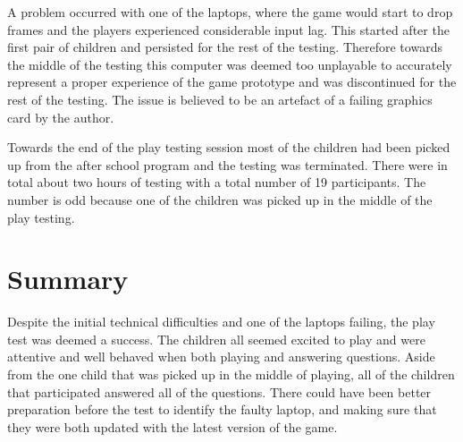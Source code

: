 
A problem occurred with one of the laptops, where the game would start to drop frames and the players experienced considerable input lag. This started after the first pair of children and persisted for the rest of the testing. Therefore towards the middle of the testing this computer was deemed too unplayable to accurately represent a proper experience of the game prototype and was discontinued for the rest of the testing. The issue is believed to be an artefact of a failing graphics card by the author.

Towards the end of the play testing session most of the children had been picked up from the after school program and the testing was terminated. There were in total about two hours of testing with a total number of 19 participants. The number is odd because one of the children was picked up in the middle of the play testing.


\section{Summary}
Despite the initial technical difficulties and one of the laptops failing, the play test was deemed a success. The children all seemed excited to play and were attentive and well behaved when both playing and answering questions. Aside from the one child that was picked up in the middle of playing, all of the children that participated answered all of the questions. There could have been better preparation before the test to identify the faulty laptop, and making sure that they were both updated with the latest version of the game.